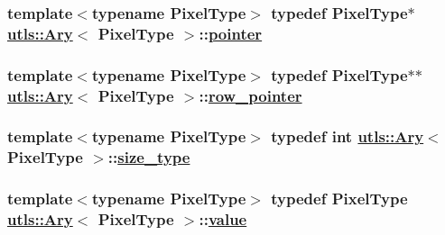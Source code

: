 \hypertarget{structutls_1_1Ary_9eb735fe995ca9b5faaef9b176a08583}{
\subsubsection[pointer]{\setlength{\rightskip}{0pt plus 5cm}template$<$typename Pixel\-Type$>$ typedef Pixel\-Type$\ast$ \hyperlink{structutls_1_1Ary}{utls::Ary}$<$ Pixel\-Type $>$::\hyperlink{structutls_1_1Ary_9eb735fe995ca9b5faaef9b176a08583}{pointer}}}
\label{structutls_1_1Ary_9eb735fe995ca9b5faaef9b176a08583}


\hypertarget{structutls_1_1Ary_d8034949f0a70efaf950686c9cd7e7ea}{
\subsubsection[row\_\-pointer]{\setlength{\rightskip}{0pt plus 5cm}template$<$typename Pixel\-Type$>$ typedef Pixel\-Type$\ast$$\ast$ \hyperlink{structutls_1_1Ary}{utls::Ary}$<$ Pixel\-Type $>$::\hyperlink{structutls_1_1Ary_d8034949f0a70efaf950686c9cd7e7ea}{row\_\-pointer}}}
\label{structutls_1_1Ary_d8034949f0a70efaf950686c9cd7e7ea}


\hypertarget{structutls_1_1Ary_8811de4f35f83e989511aaddf003376c}{
\subsubsection[size\_\-type]{\setlength{\rightskip}{0pt plus 5cm}template$<$typename Pixel\-Type$>$ typedef int \hyperlink{structutls_1_1Ary}{utls::Ary}$<$ Pixel\-Type $>$::\hyperlink{structutls_1_1Ary_8811de4f35f83e989511aaddf003376c}{size\_\-type}}}
\label{structutls_1_1Ary_8811de4f35f83e989511aaddf003376c}


\hypertarget{structutls_1_1Ary_551039ff12448ccd561c82108ed16190}{
\subsubsection[value]{\setlength{\rightskip}{0pt plus 5cm}template$<$typename Pixel\-Type$>$ typedef Pixel\-Type \hyperlink{structutls_1_1Ary}{utls::Ary}$<$ Pixel\-Type $>$::\hyperlink{structutls_1_1Ary_551039ff12448ccd561c82108ed16190}{value}}}
\label{structutls_1_1Ary_551039ff12448ccd561c82108ed16190}




